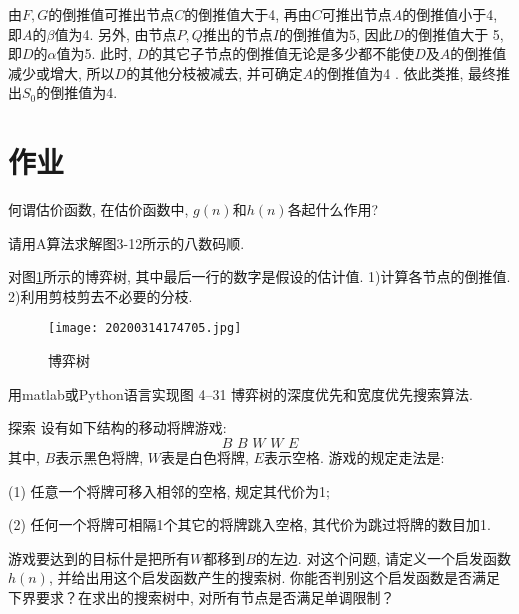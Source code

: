 由$F,G$的倒推值可推出节点$C$的倒推值大于4, 再由$C$可推出节点$A$的倒推值小于4, 即$A$的$\beta$值为4. 另外, 由节点$P,Q$推出的节点$I$的倒推值为5, 因此$D$的倒推值大于 5, 即$D$的$\alpha$值为5.
此时, $D$的其它子节点的倒推值无论是多少都不能使$D$及$A$的倒推值减少或增大, 所以$D$的其他分枝被减去, 并可确定$A$的倒推值为4 .
依此类推, 最终推出$S_0$的倒推值为4.
\section{作业}
\begin{think}
何谓估价函数, 在估价函数中, $g(n)$和$h(n)$各起什么作用?
\end{think}

\begin{think}
 请用A算法求解图3-12所示的八数码顺.
\end{think}

\begin{think}
对图\ref{20200314174705fig51}所示的博弈树, 其中最后一行的数字是假设的估计值. 1)计算各节点的倒推值. 2)利用剪枝剪去不必要的分枝.
\begin{figure}[H]
\centering
\texttt{[image: 20200314174705.jpg]}
\caption{博弈树}
\label{20200314174705fig51}
\end{figure}
\end{think}
\begin{think}
  用matlab或Python语言实现图 4–31 博弈树的深度优先和宽度优先搜索算法.
\end{think}
\begin{custom}[explorecolor]{探索}
设有如下结构的移动将牌游戏:
$$B\,\,	B\,\,		W\,\,		W\,\,		E$$
其中, $B$表示黑色将牌, $W$表是白色将牌, $E$表示空格. 游戏的规定走法是:

(1) 任意一个将牌可移入相邻的空格, 规定其代价为1;

(2) 任何一个将牌可相隔1个其它的将牌跳入空格, 其代价为跳过将牌的数目加1.

游戏要达到的目标什是把所有$W$都移到$B$的左边. 对这个问题, 请定义一个启发函数$h(n)$, 并给出用这个启发函数产生的搜索树. 你能否判别这个启发函数是否满足下界要求？在求出的搜索树中, 对所有节点是否满足单调限制？
\end{custom}




